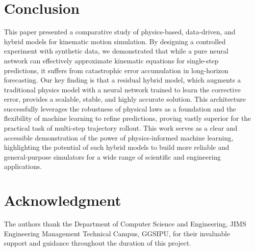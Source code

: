 \documentclass[conference]{IEEEtran}
\begin{document}
\section{Conclusion}
This paper presented a comparative study of physics-based, data-driven, and hybrid models for kinematic motion simulation. By designing a controlled experiment with synthetic data, we demonstrated that while a pure neural network can effectively approximate kinematic equations for single-step predictions, it suffers from catastrophic error accumulation in long-horizon forecasting. Our key finding is that a residual hybrid model, which augments a traditional physics model with a neural network trained to learn the corrective error, provides a scalable, stable, and highly accurate solution. This architecture successfully leverages the robustness of physical laws as a foundation and the flexibility of machine learning to refine predictions, proving vastly superior for the practical task of multi-step trajectory rollout. This work serves as a clear and accessible demonstration of the power of physics-informed machine learning, highlighting the potential of such hybrid models to build more reliable and general-purpose simulators for a wide range of scientific and engineering applications.

\section*{Acknowledgment}
The authors thank the Department of Computer Science and Engineering, JIMS Engineering Management Technical Campus, GGSIPU, for their invaluable support and guidance throughout the duration of this project.
\end{document}

